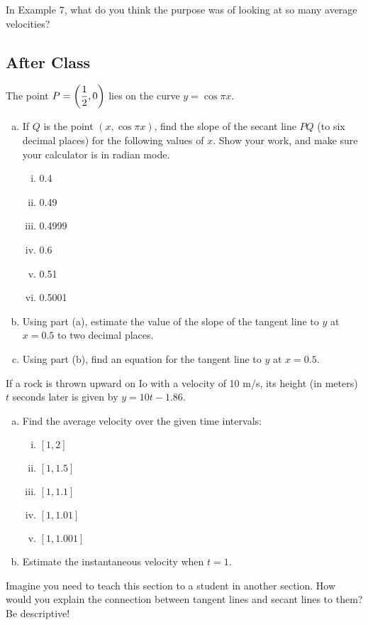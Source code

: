 \documentclass[notes]{subfiles}
\begin{document}
		\begin{question}
			In Example 7, what do you think the purpose was of looking at so many average velocities?
		\end{question}
		
		\newsec
	\subsection*{After Class}
		\begin{ex}
			The point $P = \left( \dfrac{1}{2},0\right)$ lies on the curve $y = \cos \pi x$.
			\begin{enumerate}[(a)]
				\item If $Q$ is the point $(x,\cos \pi x)$, find the slope of the secant line $PQ$ (to six decimal places) for the following values of $x$.  Show your work, and make sure your calculator is in radian mode.
				\begin{enumerate}[(i)]
					\item 0.4
					\item 0.49
					\item 0.4999
					\item 0.6
					\item 0.51
					\item 0.5001
				\end{enumerate}
				\item Using part (a), estimate the value of the slope of the tangent line to $y$ at $x = 0.5$ to two decimal places.
				\item Using part (b), find an equation for the tangent line to $y$ at $x = 0.5$.
			\end{enumerate}
		\end{ex}
			\newpage
			
		\begin{ex}
			If a rock is thrown upward on Io with a velocity of 10 m/s, its height (in meters) $t$ seconds later is given by $y = 10t - 1.86$.
			\begin{enumerate}[(a)]
				\item Find the average velocity over the given time intervals:
				\begin{enumerate}[(i)]
					\item $[1,2]$
						\vs{.5}
					\item $[1,1.5]$
						\vs{.5}
					\item $[1,1.1]$
						\vs{.5}
					\item $[1,1.01]$
						\vs{.5}
					\item $[1,1.001]$
						\vs{.5}
				\end{enumerate}
				\item Estimate the instantaneous velocity when $t = 1$.
					\vs{1}
			\end{enumerate}
		\end{ex}
		
		\begin{ex}
			Imagine you need to teach this section to a student in another section.  How would you explain the connection between tangent lines and secant lines to them?  Be descriptive!
		\end{ex}
	\clearpage
\end{document}

